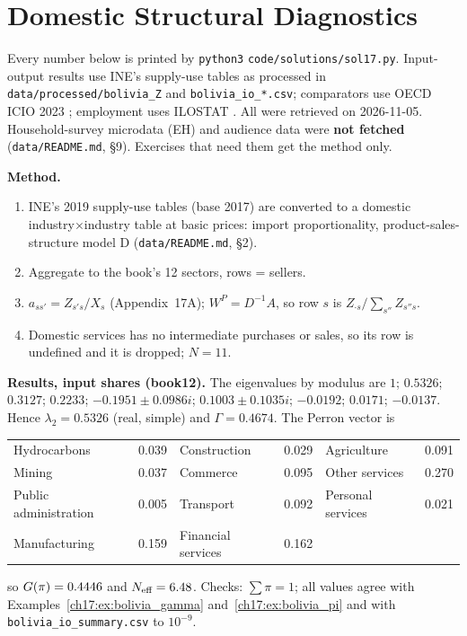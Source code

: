 \documentclass[../solutions_manual.tex]{subfiles}
\begin{document}
\begingroup\setlength{\emergencystretch}{3em}%
\ifSubfilesClassLoaded{\setcounter{chapter}{16}}{}%
\setcounter{chapter}{16}%
\chapter{Domestic Structural Diagnostics}\label{sol17}

Every number below is printed by \texttt{python3} \nolinkurl{code/solutions/sol17.py}. Input-output results use INE's supply-use tables \citep{ine2026sut} as processed in \nolinkurl{data/processed/bolivia_Z} and \nolinkurl{bolivia_io_*.csv}; comparators use OECD ICIO 2023 \citep{oecd2023icio}; employment uses ILOSTAT \citep{ilo2026ilostat}. All were retrieved on 2026-11-05. Household-survey microdata (EH) and audience data were \textbf{not fetched} (\nolinkurl{data/README.md}, \S9). Exercises that need them get the method only.


\textbf{Method.}
\begin{enumerate}
\item INE's 2019 supply-use tables (base 2017) are converted to a domestic industry$\times$industry table at basic prices: import proportionality, product-sales-structure model D (\nolinkurl{data/README.md}, \S2).
\item Aggregate to the book's 12 sectors, rows = sellers.
\item $a_{ss'} = Z_{s's}/X_s$ (Appendix~17A); $W^P = D^{-1}A$, so row $s$ is $Z_{\cdot s}/\sum_{s''}Z_{s''s}$.
\item Domestic services has no intermediate purchases or sales, so its row is undefined and it is dropped; $N = 11$.
\end{enumerate}

\textbf{Results, input shares (book12).} The eigenvalues by modulus are $1$; $0.5326$; $0.3127$; $0.2233$; $-0.1951 \pm 0.0986i$; $0.1003 \pm 0.1035i$; $-0.0192$; $0.0171$; $-0.0137$. Hence $\lambda_2 = 0.5326$ (real, simple) and $\Gamma = 0.4674$. The Perron vector is
\begin{center}
\small
\begin{tabular}{lc|lc|lc}
\toprule
Hydrocarbons & 0.039 & Construction & 0.029 & Agriculture & 0.091 \\
Mining & 0.037 & Commerce & 0.095 & Other services & 0.270 \\
Public administration & 0.005 & Transport & 0.092 & Personal services & 0.021 \\
Manufacturing & 0.159 & Financial services & 0.162 & & \\
\bottomrule
\end{tabular}
\end{center}
so $G(\pi) = 0.4446$ and $N_{\text{eff}} = 6.48$. Checks: $\sum\pi = 1$; all values agree with Examples~\ref{ch17:ex:bolivia_gamma} and~\ref{ch17:ex:bolivia_pi} and with \nolinkurl{bolivia_io_summary.csv} to $10^{-9}$.
\end{document}
